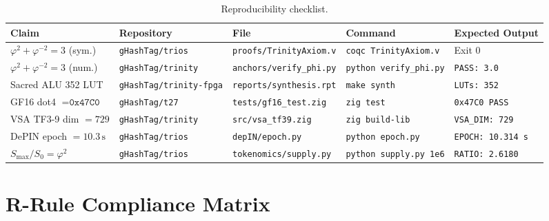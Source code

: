 \begin{table}[h]
\centering
\caption{Reproducibility checklist.}
\label{tab:repro}
\begin{tabular}{lllll}
\hline
Claim & Repository & File & Command & Expected Output \\
\hline
\(\varphi^2+\varphi^{-2}=3\) (sym.) & \texttt{gHashTag/trios} & \texttt{proofs/TrinityAxiom.v} & \texttt{coqc TrinityAxiom.v} & Exit 0 \\
\(\varphi^2+\varphi^{-2}=3\) (num.) & \texttt{gHashTag/trinity} & \texttt{anchors/verify\_phi.py} & \texttt{python verify\_phi.py} & \texttt{PASS: 3.0} \\
Sacred ALU 352 LUT & \texttt{gHashTag/trinity-fpga} & \texttt{reports/synthesis.rpt} & \texttt{make synth} & \texttt{LUTs: 352} \\
GF16 dot4 \(= \texttt{0x47C0}\) & \texttt{gHashTag/t27} & \texttt{tests/gf16\_test.zig} & \texttt{zig test} & \texttt{0x47C0 PASS} \\
VSA TF3-9 dim \(= 729\) & \texttt{gHashTag/trinity} & \texttt{src/vsa\_tf39.zig} & \texttt{zig build-lib} & \texttt{VSA\_DIM: 729} \\
DePIN epoch \(= 10.3\,\text{s}\) & \texttt{gHashTag/trios} & \texttt{depIN/epoch.py} & \texttt{python epoch.py} & \texttt{EPOCH: 10.314 s} \\
\(S_{\max}/S_0 = \varphi^2\) & \texttt{gHashTag/trios} & \texttt{tokenomics/supply.py} & \texttt{python supply.py 1e6} & \texttt{RATIO: 2.6180} \\
\hline
\end{tabular}
\end{table}


\section{R-Rule Compliance Matrix}
\label{sec:flos74-rrules}

